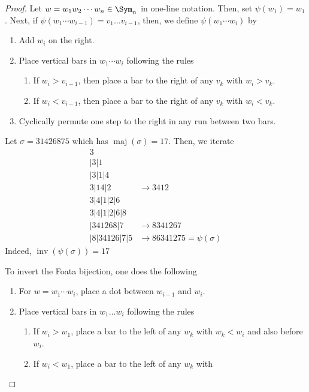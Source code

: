 \documentclass[11pt,leqno,oneside]{amsart}
\numberwithin{thm}{section}
\newcommand{\inv}{\operatorname{inv}}
\newcommand{\maj}{\operatorname{maj}}
\begin{document}
\begin{proof}
  Let \(w = w_1w_2\cdots w_n \in \Sym_n\) in one-line notation. Then,
  set \(\psi(w_1) = w_1\). Next, if \(\psi(w_1 \cdots w_{i-1}) = v_1
  \dots v_{i-1}\), then, we define \(\psi(w_1 \cdots w_i)\) by
  \begin{enumerate}
  \item Add \(w_i\) on the right.
  \item Place vertical bars in \(w_1 \cdots w_i\) following the rules
    \begin{enumerate}[label=(\roman*)]
    \item If \(w_i > v_{i-1}\), then place a bar to the right of any
      \(v_k\) with \(w_i > v_k\).
    \item If \(w_i < v_{i-1}\), then place a bar to the right of any
      \(v_k\) with \(w_i < v_k\).
    \end{enumerate}
  \item Cyclically permute one step to the right in any run between
    two bars.
  \end{enumerate}
  \begin{example}
    Let \(\sigma = 31426875\) which has \(\maj(\sigma) = 17\). Then,
    we iterate
    \begin{align*}
      3\\
      |3|1\\
      |3|1|4\\
      3|14|2&\rightarrow 3412\\
      3|4|1|2|6\\
      3|4|1|2|6|8\\
      |341268|7&\rightarrow 8341267\\
      |8|34126|7|5&\rightarrow 86341275 = \psi(\sigma)
    \end{align*}
    Indeed, \(\inv(\psi(\sigma)) = 17\)
  \end{example}
  To invert the Foata bijection, one does the following
  \begin{enumerate}
  \item For \(w = w_1 \cdots w_i\), place a dot between \(w_{i-1}\)
    and \(w_i\).
  \item Place vertical bars in \(w_1\ldots w_i\) following the rules
    \begin{enumerate}[label=(\roman*)]
    \item If \(w_i > w_1\), place a bar to the left of any \(w_k\)
      with \(w_k < w_i\) and also before \(w_i\).
    \item If \(w_i < w_1\), place a bar to the left of any \(w_k\) with

\end{enumerate}
\end{enumerate}
\end{proof}
\end{document}
